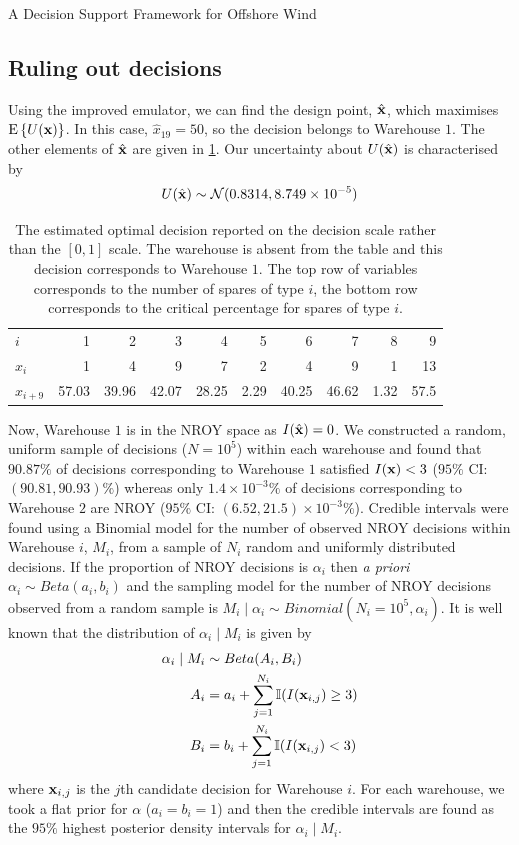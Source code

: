 \begin{chapter}{A Decision Support Framework for Offshore Wind \label{Ch:ds-for-ow}}
\subsection{Ruling out decisions}
Using the improved emulator, we can find the design point, $\hat{\mathbf{x}}$, which maximises $\textrm{E}\,\{U(\mathbf{x})\}$. In this case, $\hat{x}_{19} = 50$, so the decision belongs to Warehouse $1$. The other elements of $\hat{\mathbf{x}}$ are given in \cref{Tab:optimiser}. Our uncertainty about $U(\hat{\mathbf{x}})$ is characterised by
\begin{equation}
 U(\hat{\mathbf{x}}) \sim \mathcal{N} (0.8314, 8.749 \times 10^{-5})
\end{equation}
\begin{table}
 \centering
 \begin{tabular}{lrrrrrrrrr}
  \toprule
  $i$ &1&2&3&4&5&6&7&8&9\\\cmidrule{1-10}
  $\hat{x}_i$& 1 & 4 & 9 & 7 & 2 & 4 & 9 & 1 & 13\\
  $\hat{x}_{i+9}$ &57.03 & 39.96 & 42.07 & 28.25 & 2.29 & 40.25 & 46.62 & 1.32 & 57.5\\
  \bottomrule
 \end{tabular}
 \caption{The estimated optimal decision reported on the decision scale rather than the $[0,1]$ scale. The warehouse is absent from the table and this decision corresponds to Warehouse $1$. The top row of variables corresponds to the number of spares of type $i$, the bottom row corresponds to the critical percentage for spares of type $i$. \label{Tab:optimiser}}
\end{table}
Now, Warehouse $1$ is in the NROY space as $I(\hat{\mathbf{x}}) = 0$. We constructed a random, uniform sample of decisions ($N = 10^5$) within each warehouse and found that $90.87\%$ of decisions corresponding to Warehouse $1$ satisfied $I(\mathbf{x}) < 3$ ($95\%$ CI: $(90.81, 90.93)\%$) whereas only $1.4 \times 10^{-3}\%$ of decisions corresponding to Warehouse $2$ are NROY ($95\%$ CI: $(6.52, 21.5)\times 10^{-3}\%$). Credible intervals were found using a Binomial model for the number of observed NROY decisions within Warehouse $i$, $M_i$, from a sample of $N_i$ random and uniformly distributed decisions. If the proportion of NROY decisions is $\alpha_i$ then \textit{a priori} $\alpha_i \sim Beta(a_i, b_i)$ and the sampling model for the number of NROY decisions observed from a random sample is $M_i \mid \alpha_i \sim Binomial(N_i = 10^5, \alpha_i)$. It is well known that the distribution of $\alpha_i \mid M_i$ is given by
\begin{align}
 \alpha_i \mid M_i &\sim Beta(A_i, B_i) \\
 A_i & = a_i + \sum_{j=1}^{N_i} \mathbb{I} ( I(\mathbf{x}_{i,j}) \geq 3)\\
 B_i & = b_i + \sum_{j=1}^{N_i} \mathbb{I} ( I(\mathbf{x}_{i,j} ) < 3)
\end{align}
where $\mathbf{x}_{i,j}$ is the $j$th candidate decision for Warehouse $i$. For each warehouse, we took a flat prior for $\alpha$ ($a_i = b_i = 1$) and then the credible intervals are found as the $95\%$ highest posterior density intervals for $\alpha_i \mid M_i$.


\end{chapter}
